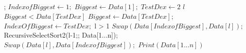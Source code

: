 \subsection{}
\Prog\qq     %
; \p
$IndexofBiggest \leftarrow 1;$\p
$Biggest \leftarrow Data[1];$\p
\Foreach $TestDex \leftarrow 2 $  \To   $l$ \Do\p
\If $Biggest < Data[TestDex]$ \Then\p
$Biggest \leftarrow Data[TestDex];$\p
$IndexOfBiggest \leftarrow TestDex;$\p
\Endif\p
\Endfor\p
\If l  > 1 \Then\p
$Swap(Data[IndexofBiggest], Data[l]);$\p
RecursiveSelectSort2(l-1;; Data[1...n]);\p
$Swap(Data[l], Data[IndexofBiggest]);$\p
\Else\p
$Print(Data[1...n])$\p
\Endif\qq
\Fini

 
 
 
 
 
 
 
 
 
 
 
 
 
 
 





